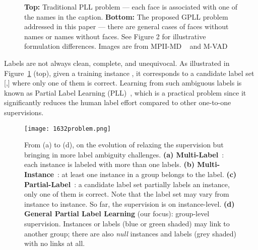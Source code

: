 \documentclass[letterpaper]{article} \usepackage{aaai20}  \usepackage{times}  \usepackage{helvet} \usepackage{courier}  \usepackage[hyphens]{url}  \usepackage{graphicx} \urlstyle{rm} \def\UrlFont{\rm}  \frenchspacing  \setlength{\pdfpagewidth}{8.5in}  \setlength{\pdfpageheight}{11in}  \frenchspacing
\newcommand{\inlineimg}[1]{\raisebox{-0.2\baselineskip}{\texttt{[image: \#1.png]}}}
\newcommand{\inlinename}[1]{\raisebox{-0.2\baselineskip}{\texttt{[image: \#1.png]}}}
\newcommand{\inlinepe}[1]{\raisebox{-0.2\baselineskip}{\texttt{[image: \#1.png]}}}
\begin{document}
 \begin{figure}[!th]
\caption{\textbf{Top:} Traditional PLL problem --- each face is associated with one of the names in the caption. \textbf{Bottom:} The proposed GPLL problem addressed in this paper --- there are general cases of faces without names or names without faces.  See Figure 2 for illustrative formulation differences. Images are from MPII-MD ~\cite{RohrbachCVPR2017} and M-VAD ~\cite{pini2019mvad}}
\label{fig:EX}

\end{figure}
Labels are not always clean, complete, and unequivocal. As illustrated in Figure~\ref{fig:EX} (top), given a training instance \inlineimg{1632tony}, it corresponds to a candidate label set [\inlinename{1632tony_n},\inlinepe{1632pepper_n}] where only one of them is correct. 
Learning from such ambiguous labels is known as Partial Label Learning (PLL)~\cite{cour2011PL}, which is a practical problem since it significantly reduces the human label effort compared to other one-to-one supervisions.

 \begin{figure*}[t]
 \centering
  \texttt{[image: 1632problem.png]}
\caption{From (a) to (d), on the evolution of relaxing the supervision but bringing in more label ambiguity challenges. \textbf{(a) Multi-Label}~\cite{huang2018fast}: each instance is labeled with more than one labels. \textbf{(b) Multi-Instance}~\cite{wu2015deep}: at least one instance in a group belongs to the label. \textbf{(c) Partial-Label}~\cite{feng2019partial}: a candidate label set partially labels an instance, only one of them is correct. Note that the label set may vary from instance to instance. So far, the supervision is on instance-level. \textbf{(d) General Partial Label Learning} (our focus): group-level supervision. Instances or labels (blue or green shaded) may link to another group; there are also \emph{null} instances and labels (grey shaded) with no links at all.}
  \label{fig:compare}
\end{figure*}
\end{document}
